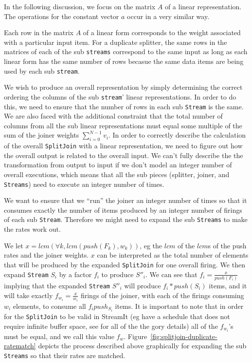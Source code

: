 In the following discussion, we focus on the matrix $A$ of a linear representation.
The operations for the constant vector $a$ occur in a very similar way.

Each row in the matrix $A$ of a linear form corresponds to the
weight associated with a particular input item. For a duplicate splitter,
the same rows in the matrices of each of the sub {\tt streams} correspond to the same
input as long as each linear form has the same number of rows becasue the same data items 
are being used by each sub {\tt stream}.

We wish to produce an overall representation by simply determining the correct 
ordering the columns of the sub {\tt stream}' linear representations. In order to
do this, we need to ensure that the number of rows in each sub {\tt Stream} is the same.
We are also faced with the additional constraint that the total number of columns 
from all the sub linear representations must equal some multiple of the sum of the
joiner weights $\sum_{i=0}^{N-1}v_i$. In order to correctly describe the calculation
of the overall {\tt SplitJoin} with a linear representation, we need to figure out 
how the overall output is related to the overall input. We can't fully describe the
the transformation from output to input if we don't model an integer number of overall
executions, which means that all the sub pieces (splitter, joiner, and {\tt Streams})
need to execute an integer number of times.

We want to ensure that we ``run'' the joiner an integer number of times so that it 
consumes exactly the number of items produced by an integer number of firings of
each sub {\tt Stream}. Therefore we might need to expand the sub {\tt Streams}
to make the rates work out.

We let $x=lcm(\forall k, lcm(push(F_k),w_k))$, eg the
$lcm$ of the $lcm$s of the push rates and the joiner weights.
$x$ can be interpreted as the total number of elements that will be 
produced by the expanded {\tt SplitJoin} for one overall firing.
We then expand {\tt Stream} $S_i$ by a factor $f_i$ to produce $S''_i$.
We can see that $f_i=\frac{x}{push(F_i)}$ implying that the expanded {\tt Stream} $S''_i$ will
produce $f_i*push(S_i)$ items, and it will take exactly $f_{w_i}=\frac{x}{w_i}$ firings of the 
joiner, with each of the firings consuming $w_i$ elements, to consume all $f_{i}push_{S_i}$ items.
It is important to note that in order for the {\tt SplitJoin} to be valid in StreamIt
(eg have a schedule that does not require infinite buffer space, see \cite{karczma-thesis} for
all of the the gory details) all of the $f_{w_i}$'s must be equal, and we call this value $f_w$.
Figure~\ref{fig:splitjoin-duplicate-ratematch} depicts the process described above graphically for
expanding the sub {\tt Streams} so that their rates are matched.

